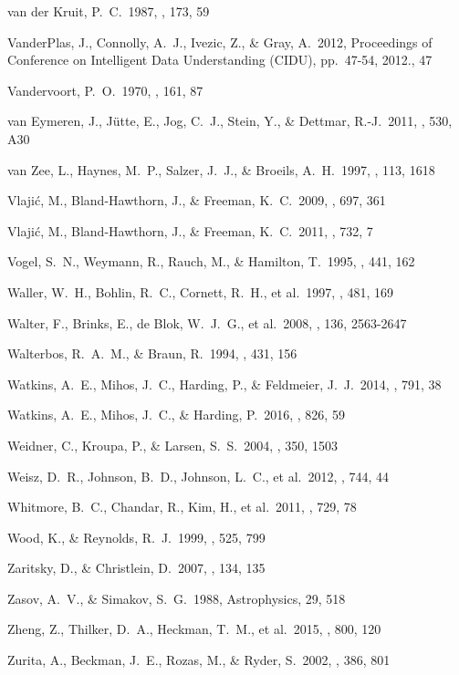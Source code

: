  van der Kruit, P.~C.\ 1987, \aap, 173, 59 

 VanderPlas, J., Connolly, A.~J., Ivezic, Z., \& Gray, A.\ 2012, Proceedings of Conference on Intelligent Data Understanding (CIDU), pp.~47-54, 2012., 47 

 Vandervoort, P.~O.\ 1970, \apj, 161, 87 

 van Eymeren, J., J{\"u}tte, E., Jog, C.~J., Stein, Y., \& Dettmar, R.-J.\ 2011, \aap, 530, A30 


 van Zee, L., Haynes, M.~P., Salzer, J.~J., \& Broeils, A.~H.\ 1997, \aj, 113, 1618 


 Vlaji{\'c}, M., Bland-Hawthorn, J., \& Freeman, K.~C.\ 2009, \apj, 697, 361 


 Vlaji{\'c}, M., Bland-Hawthorn, J., \& Freeman, K.~C.\ 2011, \apj, 732, 7 

 Vogel, S.~N., Weymann, R., Rauch, M., \& Hamilton, T.\ 1995, \apj, 441, 162 

 Waller, W.~H., Bohlin, R.~C., Cornett, R.~H., et al.\ 1997, \apj, 481, 169 

 Walter, F., Brinks, E., de Blok, W.~J.~G., et al.\ 2008, \aj, 136, 2563-2647 

 Walterbos, R.~A.~M., \& Braun, R.\ 1994, \apj, 431, 156 


 Watkins, A.~E., Mihos,
 J.~C., Harding, P., \& Feldmeier, J.~J.\ 2014, \apj, 791, 38 


 Watkins, A.~E., Mihos, J.~C., \& Harding, P.\ 2016, \apj, 826, 59 

 Weidner, C., Kroupa, P., \& Larsen, S.~S.\ 2004, \mnras, 350, 1503 

 Weisz, D.~R., Johnson, B.~D., Johnson, L.~C., et al.\ 2012, \apj, 744, 44 

 Whitmore, B.~C., Chandar, R., Kim, H., et al.\ 2011, \apj, 729, 78 

 Wood, K., \& Reynolds, R.~J.\ 1999, \apj, 525, 799 


 Zaritsky, D., \& Christlein, D.\ 2007, \aj, 134, 135 


 Zasov, A.~V., \& Simakov, S.~G.\ 1988, Astrophysics, 29, 518 


 Zheng, Z., Thilker, D.~A., Heckman, T.~M., et al.\ 2015, \apj, 800, 120 


 Zurita, A., Beckman, J.~E., Rozas, M., \& Ryder, S.\ 2002, \aap, 386, 801 
